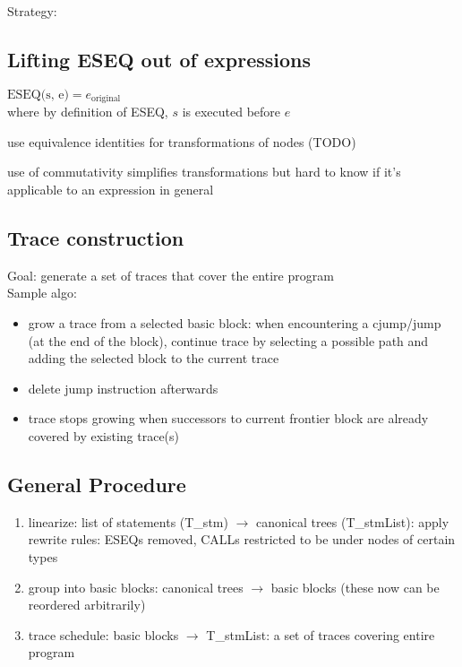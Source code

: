 \documentclass[8pt]{extarticle}
\begin{document}
\begin{multicols*}{2}
  Strategy:

  \subsection{Lifting ESEQ out of expressions}
  $\text{ESEQ(s, e)} = e_{\text{original}}$\\
  where by definition of ESEQ, $s$ is executed before $e$

  use equivalence identities for transformations of nodes (TODO)

  use of commutativity simplifies transformations but hard to know if it's applicable to an expression in general

  \subsection{Trace construction}
  Goal: generate a set of traces that cover the entire program\\

  Sample algo:
  \begin{itemize}
  \item grow a trace from a selected basic block: when encountering a cjump/jump (at the end of the block), continue trace by selecting a possible path and adding the selected block to the current trace
  \item delete jump instruction afterwards
  \item trace stops growing when successors to current frontier block are already covered by existing trace(s)
  \end{itemize}

  \subsection{General Procedure}
  \begin{enumerate}
  \item linearize: list of statements (T\_stm) $\rightarrow$ canonical trees (T\_stmList): apply rewrite rules: ESEQs removed, CALLs restricted to be under nodes of certain types
  \item group into basic blocks: canonical trees $\rightarrow$ basic blocks (these now can be reordered arbitrarily)
  \item trace schedule: basic blocks $\rightarrow$ T\_stmList: a set of traces covering entire program
  \end{enumerate}


\end{multicols*}
\end{document}
